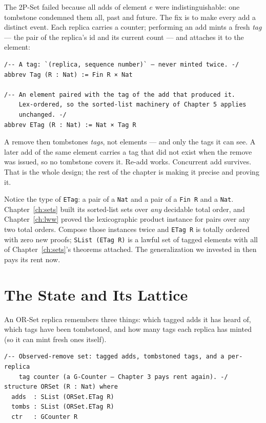 \documentclass[12pt, a4paper, openright]{book}
\theoremstyle{thmstyle}
\theoremstyle{defstyle}
\newcommand{\lc}[1]{\texttt{#1}}
\begin{document}
The 2P-Set failed because all adds of element $e$ were
indistinguishable: one tombstone condemned them all, past and future.
The fix is to make every add a distinct event. Each replica carries a
counter; performing an add mints a fresh \emph{tag} --- the pair of the
replica's id and its current count --- and attaches it to the element:

\begin{verbatim}
/-- A tag: `(replica, sequence number)` — never minted twice. -/
abbrev Tag (R : Nat) := Fin R × Nat

/-- An element paired with the tag of the add that produced it.
    Lex-ordered, so the sorted-list machinery of Chapter 5 applies
    unchanged. -/
abbrev ETag (R : Nat) := Nat × Tag R
\end{verbatim}

A remove then tombstones \emph{tags}, not elements --- and only the tags
it can see. A later add of the same element carries a tag that did not
exist when the remove was issued, so no tombstone covers it. Re-add
works. Concurrent add survives. That is the whole design; the rest of
the chapter is making it precise and proving it.

Notice the type of \lc{ETag}: a pair of a \lc{Nat} and a pair of a
\lc{Fin R} and a \lc{Nat}. Chapter~\ref{ch:sets} built its sorted-list
sets over \emph{any} decidable total order, and
Chapter~\ref{ch:lww} proved the lexicographic product instance for
pairs over any two total orders. Compose those instances twice and
\lc{ETag R} is totally ordered with zero new proofs; \lc{SList (ETag R)}
is a lawful set of tagged elements with all of Chapter~\ref{ch:sets}'s
theorems attached. The generalization we invested in then pays its rent
now.

\section{The State and Its Lattice}
\label{sec:orset-lattice}

An OR-Set replica remembers three things: which tagged adds it has
heard of, which tags have been tombstoned, and how many tags each
replica has minted (so it can mint fresh ones itself).

\begin{verbatim}
/-- Observed-remove set: tagged adds, tombstoned tags, and a per-replica
    tag counter (a G-Counter — Chapter 3 pays rent again). -/
structure ORSet (R : Nat) where
  adds  : SList (ORSet.ETag R)
  tombs : SList (ORSet.ETag R)
  ctr   : GCounter R
\end{verbatim}
\end{document}
